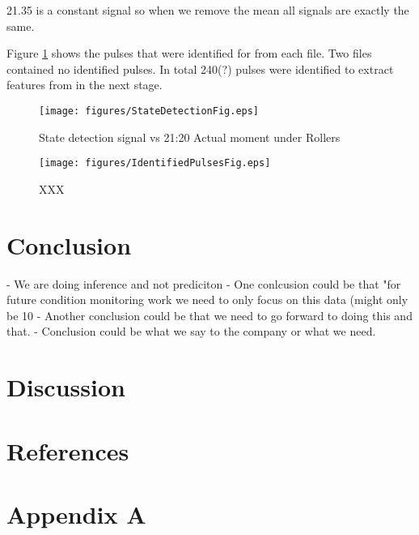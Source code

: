 \documentclass{article}
\begin{document}
21.35 is a constant signal so when we remove the mean all signals are exactly the same.

Figure \ref{fig:StateDetection} shows the pulses that were identified for from each file. Two files contained no identified pulses. In total 240(?) pulses were identified to extract features from in the next stage.

\begin{figure}[!ht]
    \centering
    \texttt{[image: figures/StateDetectionFig.eps]}
    \caption{State detection signal vs 21:20 Actual moment under Rollers}
    \label{fig:StateDetection}
\end{figure}

\begin{figure}[!ht]
    \centering
    \texttt{[image: figures/IdentifiedPulsesFig.eps]}
    \caption{XXX}
    \label{fig:IdentifiedPulses}
\end{figure}

\newpage  
\section{Conclusion}
- We are doing inference and not prediciton
- One conlcusion could be that "for future condition monitoring work we need to only focus on this data (might only be 10%
- Another conclusion could be that we need to go forward to doing this and that.
- Conclusion could be what we say to the company or what we need.
\newpage 
\section{Discussion} 

\newpage  
\section{References} 

 

\newpage  
\section{Appendix A}
\end{document}
